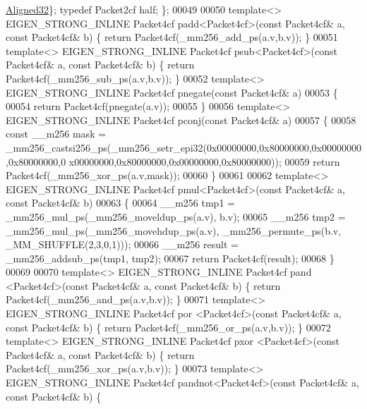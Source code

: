 \begin{DoxyCode}
      \hyperlink{group__enums_gga45fe06e29902b7a2773de05ba27b47a1a7797d247b86f6e9837cc338beb6060de}{Aligned32}\}; \textcolor{keyword}{typedef} Packet2cf half; \};
00049 
00050 \textcolor{keyword}{template}<> EIGEN\_STRONG\_INLINE Packet4cf padd<Packet4cf>(\textcolor{keyword}{const} Packet4cf& a, \textcolor{keyword}{const} Packet4cf& b) \{ \textcolor{keywordflow}{return} 
      Packet4cf(\_mm256\_add\_ps(a.v,b.v)); \}
00051 \textcolor{keyword}{template}<> EIGEN\_STRONG\_INLINE Packet4cf psub<Packet4cf>(\textcolor{keyword}{const} Packet4cf& a, \textcolor{keyword}{const} Packet4cf& b) \{ \textcolor{keywordflow}{return} 
      Packet4cf(\_mm256\_sub\_ps(a.v,b.v)); \}
00052 \textcolor{keyword}{template}<> EIGEN\_STRONG\_INLINE Packet4cf pnegate(\textcolor{keyword}{const} Packet4cf& a)
00053 \{
00054   \textcolor{keywordflow}{return} Packet4cf(pnegate(a.v));
00055 \}
00056 \textcolor{keyword}{template}<> EIGEN\_STRONG\_INLINE Packet4cf pconj(\textcolor{keyword}{const} Packet4cf& a)
00057 \{
00058   \textcolor{keyword}{const} \_\_m256 mask = \_mm256\_castsi256\_ps(\_mm256\_setr\_epi32(0x00000000,0x80000000,0x00000000,0x80000000,0
      x00000000,0x80000000,0x00000000,0x80000000));
00059   \textcolor{keywordflow}{return} Packet4cf(\_mm256\_xor\_ps(a.v,mask));
00060 \}
00061 
00062 \textcolor{keyword}{template}<> EIGEN\_STRONG\_INLINE Packet4cf pmul<Packet4cf>(\textcolor{keyword}{const} Packet4cf& a, \textcolor{keyword}{const} Packet4cf& b)
00063 \{
00064   \_\_m256 tmp1 = \_mm256\_mul\_ps(\_mm256\_moveldup\_ps(a.v), b.v);
00065   \_\_m256 tmp2 = \_mm256\_mul\_ps(\_mm256\_movehdup\_ps(a.v), \_mm256\_permute\_ps(b.v, \_MM\_SHUFFLE(2,3,0,1)));
00066   \_\_m256 result = \_mm256\_addsub\_ps(tmp1, tmp2);
00067   \textcolor{keywordflow}{return} Packet4cf(result);
00068 \}
00069 
00070 \textcolor{keyword}{template}<> EIGEN\_STRONG\_INLINE Packet4cf pand   <Packet4cf>(\textcolor{keyword}{const} Packet4cf& a, \textcolor{keyword}{const} Packet4cf& b) \{ \textcolor{keywordflow}{
      return} Packet4cf(\_mm256\_and\_ps(a.v,b.v)); \}
00071 \textcolor{keyword}{template}<> EIGEN\_STRONG\_INLINE Packet4cf por    <Packet4cf>(\textcolor{keyword}{const} Packet4cf& a, \textcolor{keyword}{const} Packet4cf& b) \{ \textcolor{keywordflow}{
      return} Packet4cf(\_mm256\_or\_ps(a.v,b.v)); \}
00072 \textcolor{keyword}{template}<> EIGEN\_STRONG\_INLINE Packet4cf pxor   <Packet4cf>(\textcolor{keyword}{const} Packet4cf& a, \textcolor{keyword}{const} Packet4cf& b) \{ \textcolor{keywordflow}{
      return} Packet4cf(\_mm256\_xor\_ps(a.v,b.v)); \}
00073 \textcolor{keyword}{template}<> EIGEN\_STRONG\_INLINE Packet4cf pandnot<Packet4cf>(\textcolor{keyword}{const} Packet4cf& a, \textcolor{keyword}{const} Packet4cf& b) \{ \textcolor{keywordflow}{
}
\end{DoxyCode}
